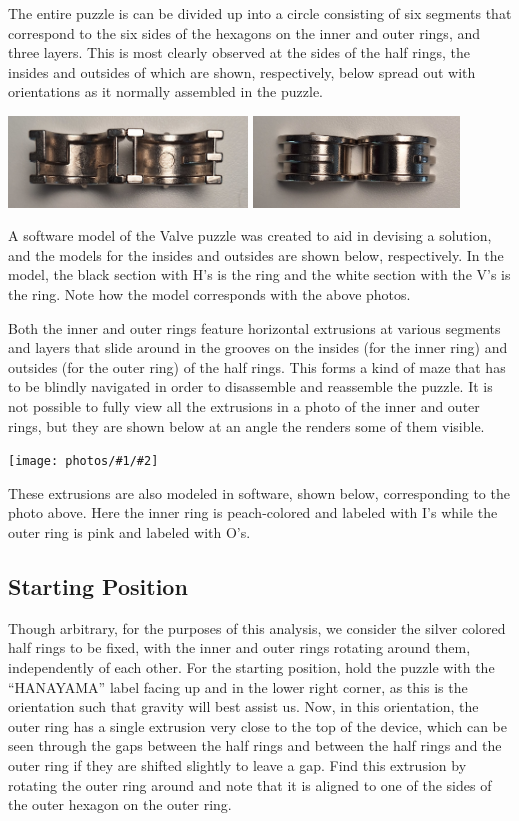 \documentclass{article}
\newcommand{\photo}[3]{
      \begin{center}
            \texttt{[image: photos/\#1/\#2]}
      \end{center}
}
\begin{document}
The entire puzzle is can be divided up into a circle consisting of six segments that correspond to the six sides of the hexagons on the inner and outer rings, and three layers.
This is most clearly observed at the sides of the half rings, the insides and outsides of which are shown, respectively, below spread out with orientations as it normally assembled in the puzzle.
\begin{center}
      \includegraphics[height=0.955in]{photos/valve/halves-inside}
      \includegraphics[height=0.955in]{photos/valve/halves-outside}
\end{center}
A software model of the Valve puzzle was created to aid in devising a solution, and the models for the insides and outsides are shown below, respectively.
In the model, the black section with H's is the \hhalf{} ring and the white section with the V's is the \vhalf{} ring.
Note how the model corresponds with the above photos.

Both the inner and outer rings feature horizontal extrusions at various segments and layers that slide around in the grooves on the insides (for the inner ring) and outsides (for the outer ring) of the half rings.
This forms a kind of maze that has to be blindly navigated in order to disassemble and reassemble the puzzle.
It is not possible to fully view all the extrusions in a photo of the inner and outer rings, but they are shown below at an angle the renders some of them visible.
\photo{valve}{rings}{2.5}
These extrusions are also modeled in software, shown below, corresponding to the photo above.
Here the inner ring is peach-colored and labeled with I's while the outer ring is pink and labeled with O's.

\subsection{Starting Position}

Though arbitrary, for the purposes of this analysis, we consider the silver colored half rings to be fixed, with the inner and outer rings rotating around them, independently of each other.
For the starting position, hold the puzzle with the ``HANAYAMA'' label facing up and in the lower right corner, as this is the orientation such that gravity will best assist us.
Now, in this orientation, the outer ring has a single extrusion very close to the top of the device, which can be seen through the gaps between the half rings and between the half rings and the outer ring if they are shifted slightly to leave a gap.
Find this extrusion by rotating the outer ring around and note that it is aligned to one of the sides of the outer hexagon on the outer ring.
\end{document}
